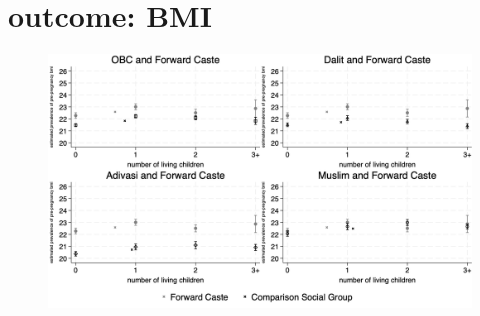 \documentclass{article}
\begin{document}









\section{outcome: BMI}
\begin{figure}[H]
    \centering
    \includegraphics[width=\textwidth]{figures/prepreg_bmi_combined.png}
\end{figure}
\end{document}
